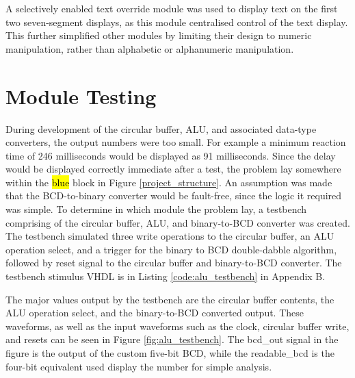 \documentclass[11pt]{article}
\begin{document}
A selectively enabled text override module was used to display text on the first two seven-segment displays,  as this module centralised control of the text display. This further simplified other modules by limiting their design to numeric manipulation, rather than alphabetic or alphanumeric manipulation. 


\section{Module Testing}


During development of the circular buffer, ALU, and associated data-type converters, the output numbers were too small. For example a minimum reaction time of 246 milliseconds would be displayed as 91 milliseconds. Since the delay would be displayed correctly immediate after a test, the problem lay somewhere within the \hl{blue} block in Figure \ref{project_structure}. An assumption was made that the BCD-to-binary converter would be fault-free, since the logic it required was simple. To determine in which module the problem lay, a testbench comprising of the circular buffer, ALU, and binary-to-BCD converter was created. The testbench simulated three write operations to the circular buffer, an ALU operation select, and a trigger for the binary to BCD double-dabble algorithm, followed by reset signal to the circular buffer and binary-to-BCD converter. The testbench stimulus VHDL is in Listing \ref{code:alu_testbench} in Appendix B.

The major values output by the testbench are the circular buffer contents, the ALU operation select, and the binary-to-BCD converted output. These waveforms, as well as the input waveforms such as the clock, circular buffer write, and resets can be seen in Figure \ref{fig:alu_testbench}. The bcd\_out signal in the figure is the output of the custom five-bit BCD, while the readable\_bcd is the four-bit equivalent used display the number for simple analysis.
\end{document}
